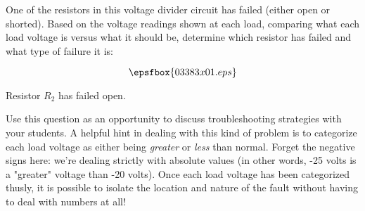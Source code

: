 

One of the resistors in this voltage divider circuit has failed (either open or shorted).  Based on the voltage readings shown at each load, comparing what each load voltage is versus what it should be, determine which resistor has failed and what type of failure it is:

$$\epsfbox{03383x01.eps}$$







Resistor $R_2$ has failed open.







Use this question as an opportunity to discuss troubleshooting strategies with your students.  A helpful hint in dealing with this kind of problem is to categorize each load voltage as either being {\it greater} or {\it less} than normal.  Forget the negative signs here: we're dealing strictly with absolute values (in other words, -25 volts is a "greater" voltage than -20 volts).  Once each load voltage has been categorized thusly, it is possible to isolate the location and nature of the fault without having to deal with numbers at all!




